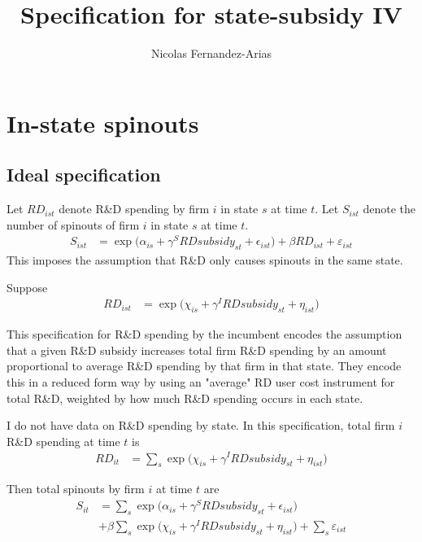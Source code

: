 \documentclass[12pt,english]{article}
\theoremstyle{remark}
\begin{document}
	
\title{Specification for state-subsidy IV}
\author{Nicolas Fernandez-Arias}
\maketitle

\section{In-state spinouts}

\subsection{Ideal specification}

Let $RD_{ist}$ denote R\&D spending by firm $i$ in state $s$ at time $t$. Let $S_{ist}$ denote the number of spinouts of firm $i$ in state $s$ at time $t$. 
\begin{align}
	S_{ist} &= \exp\Big(\alpha_{is} + \gamma^S RDsubsidy_{st} + \epsilon_{ist}\Big) + \beta RD_{ist} + \varepsilon_{ist} \label{spinouts_ist}
\end{align}
This imposes the assumption that R\&D only causes spinouts in the same state.

Suppose 
\begin{align}
	RD_{ist} &= \exp \Big( \chi_{is} + \gamma^I RDsubsidy_{st} + \eta_{ist} \Big)
\end{align}

This specification for R\&D spending by the incumbent encodes the assumption that a given R\&D subsidy increases total firm R\&D spending by an amount proportional to average R\&D spending by that firm in that state. They encode this in a reduced form way by using an "average" RD user cost instrument for total R\&D, weighted by how much R\&D spending occurs in each state. 

I do not have data on R\&D spending by state. In this specification, total firm $i$ R\&D spending at time $t$ is
\begin{align}
	RD_{it} &= \sum_s \exp \Big( \chi_{is} + \gamma^I RDsubsidy_{st} + \eta_{ist} \Big)
\end{align}

Then total spinouts by firm $i$ at time $t$ are 
\begin{align}
	S_{it} &= \sum_s \exp\Big(\alpha_{is} + \gamma^S RDsubsidy_{st} + \epsilon_{ist}\Big) \nonumber \\
	       &+ \beta \sum_s \exp \Big( \chi_{is} + \gamma^I RDsubsidy_{st} + \eta_{ist} \Big) + \sum_s \varepsilon_{ist} 
\end{align}
\end{document}
